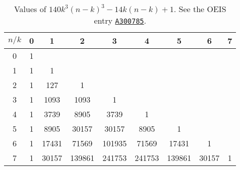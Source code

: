 \begin{table}[H]
    \setlength\extrarowheight{-6pt}
    \begin{tabular}{c|cccccccc}
        $n/k$ & 0 & 1     & 2      & 3      & 4      & 5      & 6     & 7 \\
        \hline
        0     & 1 &       &        &        &        &        &       &   \\
        1     & 1 & 1     &        &        &        &        &       &   \\
        2     & 1 & 127   & 1      &        &        &        &       &   \\
        3     & 1 & 1093  & 1093   & 1      &        &        &       &   \\
        4     & 1 & 3739  & 8905   & 3739   & 1      &        &       &   \\
        5     & 1 & 8905  & 30157  & 30157  & 8905   & 1      &       &   \\
        6     & 1 & 17431 & 71569  & 101935 & 71569  & 17431  & 1     &   \\
        7     & 1 & 30157 & 139861 & 241753 & 241753 & 139861 & 30157 & 1
    \end{tabular}
    \caption{Values of $140 k^3 (n-k)^3 - 14k(n-k) + 1$.
    See the OEIS entry \href{https://oeis.org/A300785}{\texttt{A300785}}.}
    \label{tab:row-sums-gives-seventh-power}
\end{table}
